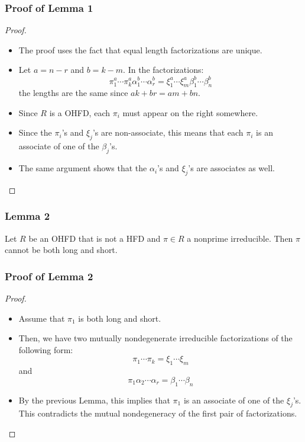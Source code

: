 \begin{frame}
  \frametitle{Proof of Lemma 1}
  \begin{proof}
    \begin{itemize}
      \item <1->The proof uses the fact that equal length factorizations are unique.
      \item <2->Let $a = n-r$ and $b = k - m$. In the factorizations:
	  $$\pi_1^a\cdots\pi_k^a\alpha_1^b\cdots\alpha_r^b=\xi_1^a\cdots\xi_m^a\beta_1^b\cdots\beta_n^b$$
	the lengths are the same since $ak+br=am+bn$. 
      \item <3->
	Since $R$ is a OHFD, each $\pi_i$ must appear on the right somewhere.
      \item<4->
	Since the $\pi_i$'s and $\xi_j$'s are non-associate, this means that each $\pi_i$ is an associate of one of the $\beta_j$'s. 
      \item<5->The same argument shows that the $\alpha_i$'s and $\xi_j$'s are associates as well.
    \end{itemize}
  \end{proof}
\end{frame}

\begin{frame}
  \frametitle{Lemma 2}
  \begin{lemma}
    Let $R$ be an OHFD that is not a HFD and $\pi \in R$ a nonprime irreducible.
    Then $\pi$ cannot be both long and short.
  \end{lemma}
\end{frame}

\begin{frame}
  \frametitle{Proof of Lemma 2}
  \begin{proof}
    \begin{itemize}
      \item <1->Assume that $\pi_1$ is both long and short.
      \item <2->Then, we have two mutually nondegenerate irreducible factorizations of the following form:
	  $$\pi_1\cdots\pi_k=\xi_1\cdots\xi_m$$
	and
	  $$\pi_1\alpha_2\cdots\alpha_r=\beta_1\cdots\beta_n$$
      \item <3->By the previous Lemma, this implies that $\pi_1$ is an associate of one of the $\xi_j$'s.
	This contradicts the mutual nondegeneracy of the first pair of factorizations.
    \end{itemize}
  \end{proof}
\end{frame}

